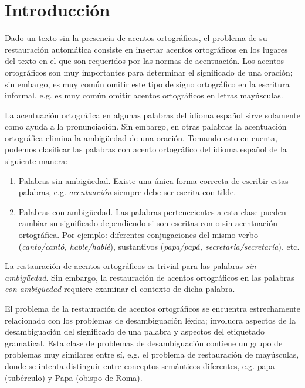 \documentclass[runningheads,a4paper]{llncs}
\begin{document}
\section{Introducción}
Dado un texto sin la presencia de acentos ortográficos, el problema de su  restauración automática consiste en insertar acentos ortográficos en los lugares del texto en el que son requeridos por las normas de acentuación. Los acentos ortográficos son muy importantes para determinar el significado de una oración; sin embargo, es muy común omitir este tipo de signo ortográfico en la escritura informal, e.g. es muy común omitir acentos ortográficos en letras mayúsculas.

La acentuación ortográfica en algunas palabras del idioma español sirve solamente como ayuda a la pronunciación. Sin embargo, en otras palabras la acentuación ortográfica elimina la ambigüedad de una oración. Tomando esto en cuenta, podemos clasificar las palabras con acento ortográfico del idioma español de la siguiente manera\cite{CRANDALL95}:
\begin{enumerate}
\item{Palabras sin ambigüedad}. Existe una única forma correcta de escribir estas palabras, e.g. \emph{acentuación} siempre debe ser escrita con tilde.
\item{Palabras con ambigüedad}. Las palabras pertenecientes a esta clase pueden cambiar su significado dependiendo si son escritas con o sin acentuación ortográfica. Por ejemplo: diferentes conjugaciones del mismo verbo (\emph{canto/cantó, hable/hablé}), sustantivos (\emph{papa/papá, secretaria/secretaría}), etc.
\end{enumerate}

La restauración de acentos ortográficos es trivial para las palabras \emph{sin ambig\"uedad}. Sin embargo, la restauración de acentos ortográficos en las palabras \emph{con ambig\"uedad} requiere examinar el contexto de dicha palabra. 

El problema de la restauración de acentos ortográficos se encuentra estrechamente relacionado con los problemas de desambiguación léxica; involucra aspectos de la desambiguación del significado de una palabra y aspectos del etiquetado gramatical. Esta clase de problemas de desambiguación contiene un grupo de problemas muy similares entre sí, e.g. el problema de restauración de mayúsculas, donde se intenta distinguir entre conceptos semánticos diferentes, e.g. papa (tubérculo) y Papa (obispo de Roma).
\end{document}
